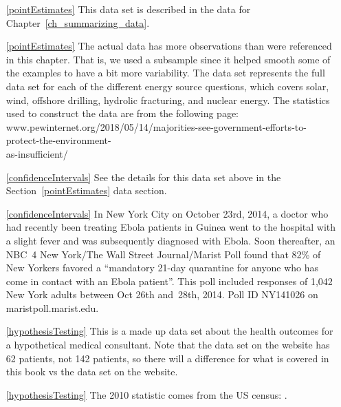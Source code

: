 \begin{itemize}

\item[\ref{pointEstimates}]
    This data set is described in
    the data for Chapter~\ref{ch_summarizing_data}.

\item[\ref{pointEstimates}]
    The actual data has more observations than were referenced
    in this chapter.
    That is, we used a subsample since it helped smooth some
    of the examples to have a bit more variability.
    The  data set represents
    the full data set for each of the different energy source
    questions, which covers solar, wind, offshore drilling,
    hydrolic fracturing, and nuclear energy.
    The statistics used to construct the data are from
    the following page: \\
        {{\small{www.pewinternet.org/2018/05/14/majorities-see-government-efforts-to-protect-the-environment-\\as-insufficient/}}}
    
\item[\ref{confidenceIntervals}]
    See the details for this data set above
    in the Section~\ref{pointEstimates} data section.
\item[\ref{confidenceIntervals}]
    In New York City on October 23rd, 2014, a doctor who had
    recently been treating Ebola patients in Guinea went to
    the hospital with a slight fever and was subsequently
    diagnosed with Ebola.
    Soon thereafter, an NBC~4 New York/The Wall Street
    Journal/Marist Poll found that
    82\% of New Yorkers favored a
    ``mandatory 21-day quarantine for anyone who has come
    in contact with an Ebola patient''.
    This poll included responses of 1,042
    New York adults between Oct 26th and~28th, 2014.
        {Poll ID NY141026 on maristpoll.marist.edu}.

\item[\ref{hypothesisTesting}]
    This is a made up data set about the health outcomes
    for a hypothetical medical consultant.
    Note that the data set on the website has 62 patients,
    not 142 patients, so there will a difference for what
    is covered in this book vs the data set on the website.

\item[\ref{hypothesisTesting}]
    The 2010 statistic comes from the US census:
    .

\end{itemize}


